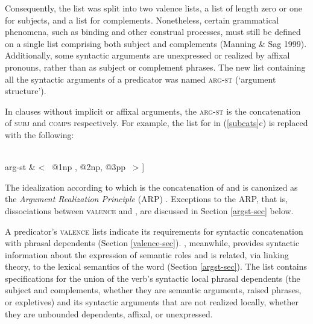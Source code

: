 \documentclass[output=paper]{langsci/langscibook}
\begin{document}
Consequently, the \subcat list was split into two valence lists, a \subj list of length zero or one for subjects, and a \comps list for complements.  Nonetheless, certain grammatical phenomena, such as binding and other construal processes, must still be defined on a single list comprising both subject and complements (Manning \& Sag 1999). Additionally, some syntactic arguments are unexpressed or realized by affixal pronouns, rather than as subject or complement phrases.  
The new list containing all the syntactic arguments of a predicator was named \textsc{arg-st} (`argument structure').  

In clauses without implicit or affixal arguments, the \textsc{arg-st} is the concatenation of  \textsc{subj} and \textsc{comps} respectively.  For example, the \subcat list for  in (\ref{subcats}c) is replaced with the following:

\begin{exe} 
	\label{put}
\ex	%
\begin{avm}
[ phon & < \textrm{put} > \\
valence & [ subj \ \ & <  \ {@1} \ > \\ 
comps \ \ & < \  {@2}, {@3} \  > ] \\ 
arg-st & < \ {@1}np , {@2}np, {@3}pp \  > ] 
\end{avm}
\end{exe}

\noindent
The idealization according to which \argst is the concatenation of \subj and \comps is canonized as the \emph{Argument Realization Principle} (ARP) \citep[PAGE]{SWB2003a}.  Exceptions to the ARP, that is, dissociations between \textsc{valence} and \argst, are discussed in Section \ref{argst-sec} below.  

A predicator's \textsc{valence} lists indicate its requirements for syntactic concatenation with phrasal dependents (Section \ref{valence-sec}). 
\argst, meanwhile, provides syntactic information about the expression of semantic roles and is related, via linking theory, to the lexical semantics of the word (Section \ref{argst-sec}).  
The \argst list contains specifications for the union of the verb's syntactic local phrasal dependents (the subject and complements, whether they are semantic arguments, raised phrases, or expletives) and its syntactic arguments that are not realized locally, whether they are unbounded dependents, affixal, or unexpressed. 
\end{document}
